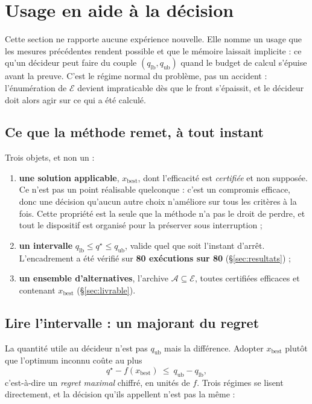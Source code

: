 \documentclass[11pt,a4paper]{article}
\theoremstyle{plain}
\theoremstyle{remark}
\newcommand{\Ecal}{\mathcal{E}}
\newcommand{\qs}{q^{\star}}
\newcommand{\Acal}{\mathcal{A}}
\begin{document}
\section{Usage en aide à la décision}
\label{sec:aide}

Cette section ne rapporte aucune expérience nouvelle. Elle nomme un usage que
les mesures précédentes rendent possible et que le mémoire laissait implicite :
ce qu'un décideur peut faire du couple $(q_{\text{lb}},q_{\text{ub}})$ quand
le budget de calcul s'épuise avant la preuve. C'est le régime normal du
problème, pas un accident : l'énumération de $\Ecal$ devient impraticable dès
que le front s'épaissit, et le décideur doit alors agir sur ce qui a été
calculé.

\subsection{Ce que la méthode remet, à tout instant}

Trois objets, et non un :

\begin{enumerate}[leftmargin=*,itemsep=3pt]
\item \textbf{une solution applicable}, $x_{\text{best}}$, dont l'efficacité
      est \emph{certifiée} et non supposée. Ce n'est pas un point réalisable
      quelconque : c'est un compromis efficace, donc une décision qu'aucun
      autre choix n'améliore sur tous les critères à la fois. Cette propriété
      est la seule que la méthode n'a pas le droit de perdre, et tout le
      dispositif est organisé pour la préserver sous interruption ;
\item \textbf{un intervalle} $q_{\text{lb}}\le\qs\le q_{\text{ub}}$, valide
      quel que soit l'instant d'arrêt. L'encadrement a été vérifié sur
      \textbf{80 exécutions sur 80} (\S\ref{sec:resultats}) ;
\item \textbf{un ensemble d'alternatives}, l'archive $\Acal\subseteq\Ecal$,
      toutes certifiées efficaces et contenant $x_{\text{best}}$
      (\S\ref{sec:livrable}).
\end{enumerate}

\subsection{Lire l'intervalle : un majorant du regret}

La quantité utile au décideur n'est pas $q_{\text{ub}}$ mais la différence.
Adopter $x_{\text{best}}$ plutôt que l'optimum inconnu coûte au plus
\[
  \qs - f(x_{\text{best}})\ \le\ q_{\text{ub}} - q_{\text{lb}},
\]
c'est-à-dire un \emph{regret maximal} chiffré, en unités de $f$. Trois
régimes se lisent directement, et la décision qu'ils appellent n'est pas la
même :
\end{document}
